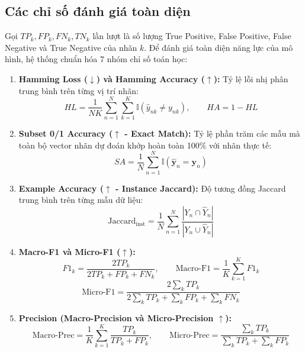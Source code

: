 \documentclass[11pt,a4paper]{article}
\begin{document}
\subsection{Các chỉ số đánh giá toàn diện}
Gọi $TP_k, FP_k, FN_k, TN_k$ lần lượt là số lượng True Positive, False Positive, False Negative và True Negative của nhãn $k$. Để đánh giá toàn diện năng lực của mô hình, hệ thống chuẩn hóa 7 nhóm chỉ số toán học:
\begin{enumerate}
    \item \textbf{Hamming Loss ($\downarrow$) và Hamming Accuracy ($\uparrow$):} Tỷ lệ lỗi nhị phân trung bình trên từng vị trí nhãn:
    \begin{equation}
    HL = \frac{1}{NK} \sum_{n=1}^N \sum_{k=1}^K \mathbb{I}(\hat{y}_{nk} \neq y_{nk}), \qquad HA = 1 - HL
    \end{equation}
    \item \textbf{Subset 0/1 Accuracy ($\uparrow$ - Exact Match):} Tỷ lệ phần trăm các mẫu mà toàn bộ vector nhãn dự đoán khớp hoàn toàn 100\% với nhãn thực tế:
    \begin{equation}
    SA = \frac{1}{N} \sum_{n=1}^N \mathbb{I}(\hat{\mathbf{y}}_n = \mathbf{y}_n)
    \end{equation}
    \item \textbf{Example Accuracy ($\uparrow$ - Instance Jaccard):} Độ tương đồng Jaccard trung bình trên từng mẫu dữ liệu:
    \begin{equation}
    \mathrm{Jaccard}_{\mathrm{inst}} = \frac{1}{N} \sum_{n=1}^N \frac{|Y_n \cap \hat{Y}_n|}{|Y_n \cup \hat{Y}_n|}
    \end{equation}
    \item \textbf{Macro-F1 và Micro-F1 ($\uparrow$):}
    \begin{equation}
    F1_k = \frac{2TP_k}{2TP_k + FP_k + FN_k}, \qquad \text{Macro-F1} = \frac{1}{K} \sum_{k=1}^K F1_k
    \end{equation}
    \begin{equation}
    \text{Micro-F1} = \frac{2 \sum_k TP_k}{2 \sum_k TP_k + \sum_k FP_k + \sum_k FN_k}
    \end{equation}
    \item \textbf{Precision (Macro-Precision và Micro-Precision $\uparrow$):}
    \begin{equation}
    \text{Macro-Prec} = \frac{1}{K}\sum_{k=1}^K \frac{TP_k}{TP_k + FP_k}, \qquad \text{Micro-Prec} = \frac{\sum_k TP_k}{\sum_k TP_k + \sum_k FP_k}
    \end{equation}
\end{enumerate}
\end{document}
